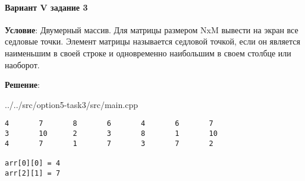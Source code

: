 \paragraph{Вариант V задание 3} \hspace{0pt}

\textbf{Условие}:
Двумерный массив.
Для матрицы размером NxM вывести на экран все седловые точки. Элемент матрицы называется седловой точкой, если он является наименьшим в своей строке и одновременно наибольшим в своем столбце или наоборот.

\textbf{Решение}:


{../../src/option5-task3/src/main.cpp}

\begin{lstlisting}[language=Out,]
4       7       8       6       4       6       7
3       10      2       3       8       1       10
4       7       1       7       3       7       2

arr[0][0] = 4
arr[2][1] = 7
\end{lstlisting}